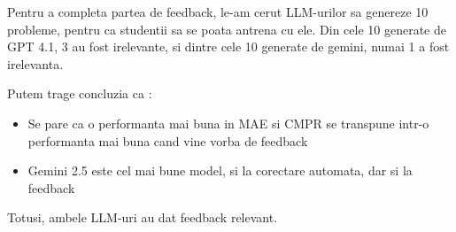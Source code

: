 \documentclass[12pt, a4paper]{report}
\begin{document}
Pentru a completa partea de feedback,
le-am cerut LLM-urilor sa genereze 10 probleme,
pentru ca studentii sa se poata antrena cu ele. 
Din cele 10 generate de GPT 4.1, 3 au fost irelevante, si dintre cele 10 generate de gemini, numai 1 a fost irelevanta.

Putem trage concluzia ca :
\begin{itemize}
  \item Se pare ca o performanta mai buna in MAE si CMPR se transpune intr-o performanta mai buna cand vine vorba de feedback
  \item Gemini 2.5 este cel mai bune model, si la corectare automata, dar si la feedback
\end{itemize}

Totusi, ambele LLM-uri au dat feedback relevant.


\printbibliography[heading=bibintoc]
\end{document}
